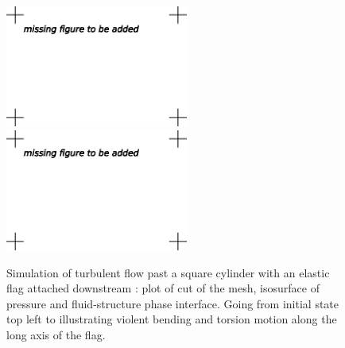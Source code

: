 \begin{figure}[!h]
{\includegraphics[width=6cm]{chapters/hoffman-1/eps/cube550.eps}
\includegraphics[width=6cm]{chapters/hoffman-1/eps/cube649.eps}
}
\caption{
Simulation of turbulent flow past a square cylinder with an elastic
flag attached downstream \cite{HoffmanJanssonEtAl2009}: plot of cut of
the mesh, isosurface of pressure and fluid-structure phase
interface. Going from initial state top left to illustrating violent
bending and torsion motion along the long axis of the flag.  }
\label{fig:flag}
\end{figure}

